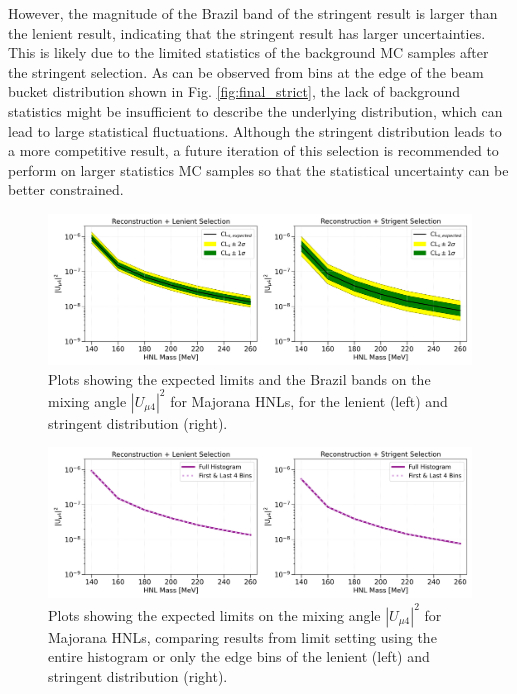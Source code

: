 However, the magnitude of the Brazil band of the stringent result is larger than the lenient result, indicating that the stringent result has larger uncertainties.
This is likely due to the limited statistics of the background MC samples after the stringent selection.
As can be observed from bins at the edge of the beam bucket distribution shown in Fig. \ref{fig:final_strict}, the lack of background statistics might be insufficient to describe the underlying distribution, which can lead to large statistical fluctuations.                                  
Although the stringent distribution leads to a more competitive result, a future iteration of this selection is recommended to perform on larger statistics MC samples so that the statistical uncertainty can be better constrained.

\begin{figure}[ht!]
    \centering
    \includegraphics[width=\textwidth]{sensitivity_strict_loose}
    \caption{Plots showing the expected limits and the Brazil bands on the mixing angle $|U_{\mu4}|^2$ for Majorana HNLs, for the lenient (left) and stringent distribution (right).}
    \label{fig:nupi0_reco_result}
\end{figure}

\begin{figure}[b!]
    \centering
    \includegraphics[width=\textwidth]{sensitivity_full_edge}
    \caption{Plots showing the expected limits on the mixing angle $|U_{\mu4}|^2$ for Majorana HNLs, comparing results from limit setting using the entire histogram or only the edge bins of the lenient (left) and stringent distribution (right).}
    \label{fig:nupi0_reco_full_edge}
\end{figure}

